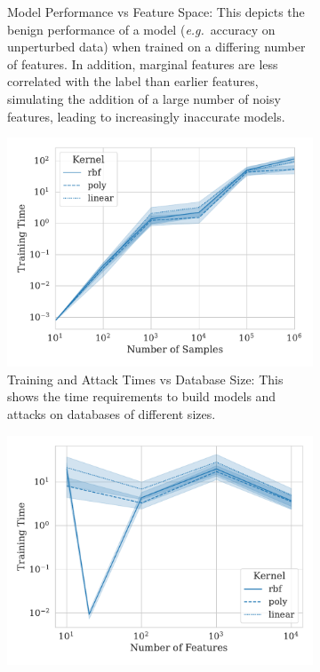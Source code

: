\documentclass[runningheads]{llncs}
\begin{document}
\begin{figure}
\begin{subfigure}{.45\textwidth}
        \caption{Model Performance vs Feature Space: This depicts the benign performance of a model (\textit{e.g.}~accuracy on unperturbed data) when trained on a differing number of features. In addition, marginal features are less correlated with the label than earlier features, simulating the addition of a large number of noisy features, leading to increasingly inaccurate models.}
        \label{fig:features_acc}
    \end{subfigure}
    \hfill
    \begin{subfigure}{.45\textwidth}
        \centering
        \includegraphics[width=\textwidth]{./generated/train_time_vs_samples.pdf}
        \caption{Training and Attack Times vs Database Size: This shows the time requirements to build models and attacks on databases of different sizes.
        }
        \label{fig:samples_time}
    \end{subfigure}
    \hfill
    \begin{subfigure}{.45\textwidth}
      \centering
        \includegraphics[width=\textwidth]{./generated/train_time_vs_features.pdf}

\end{subfigure}
\end{figure}
\end{document}
